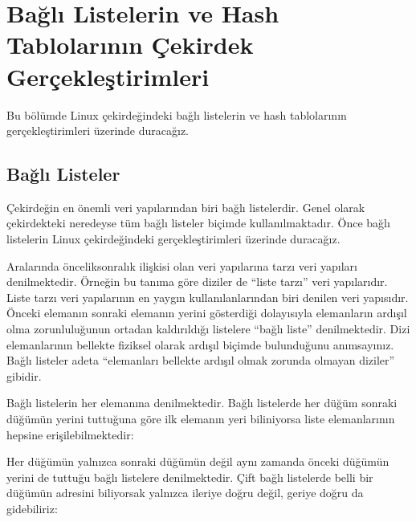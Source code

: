\documentclass[a4paper,10pt,turkish]{sphinxmanual}
\begin{document}
\sphinxstepscope


\chapter{Bağlı Listelerin ve Hash Tablolarının Çekirdek Gerçekleştirimleri}
\label{\detokenize{kernellinkedlistandhashtable:bagli-listelerin-ve-hash-tablolarinin-cekirdek-gerceklestirimleri}}\label{\detokenize{kernellinkedlistandhashtable::doc}}
\sphinxAtStartPar
Bu bölümde Linux çekirdeğindeki bağlı listelerin ve hash tablolarının gerçekleştirimleri üzerinde duracağız.


\section{Bağlı Listeler}
\label{\detokenize{kernellinkedlistandhashtable:bagli-listeler}}
\sphinxAtStartPar
Çekirdeğin en önemli veri yapılarından biri bağlı listelerdir. Genel olarak çekirdekteki neredeyse tüm
bağlı listeler  biçimde kullanılmaktadır. Önce bağlı listelerin Linux
çekirdeğindeki gerçekleştirimleri üzerinde duracağız.

\sphinxAtStartPar
Aralarında öncelik\sphinxhyphen{}sonralık ilişkisi olan veri yapılarına  tarzı veri yapıları denilmektedir.
Örneğin bu tanıma göre diziler de “liste tarzı” veri yapılarıdır. Liste tarzı veri yapılarının en yaygın
kullanılanlarından biri  denilen veri yapısıdır. Önceki elemanın sonraki
elemanın yerini gösterdiği dolayısıyla elemanların ardışıl olma zorunluluğunun ortadan kaldırıldığı
listelere “bağlı liste” denilmektedir. Dizi elemanlarının bellekte fiziksel olarak ardışıl biçimde
bulunduğunu anımsayınız. Bağlı listeler adeta “elemanları bellekte ardışıl olmak zorunda olmayan
diziler” gibidir.

\sphinxAtStartPar
Bağlı listelerin her elemanına  denilmektedir. Bağlı listelerde her düğüm sonraki
düğümün yerini tuttuğuna göre ilk elemanın yeri biliniyorsa liste elemanlarının hepsine erişilebilmektedir:


\sphinxAtStartPar
Her düğümün yalnızca sonraki düğümün değil aynı zamanda önceki düğümün yerini de tuttuğu bağlı
listelere  denilmektedir. Çift bağlı listelerde belli bir
düğümün adresini biliyorsak yalnızca ileriye doğru değil, geriye doğru da gidebiliriz:
\end{document}
